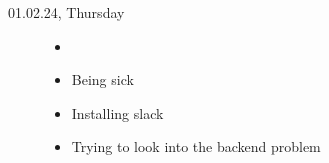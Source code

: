 \documentclass[a4, 11pt]{scrartcl}
\begin{document}
\begin{description}





\item[01.02.24, Thursday]
\begin{itemize}
	\item[]
	\item Being sick \frownie{}
	\item Installing slack
	\item Trying to look into the backend problem %
\end{itemize}









		
		
	\end{description}
	
	
	
	
	
	
\end{document}
